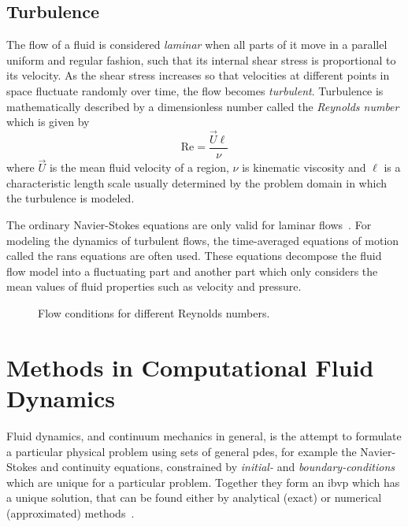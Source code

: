 \subsection{Turbulence}\label{sec:turbulence}
The flow of a fluid is considered \textit{laminar} when all parts of it move in a parallel uniform and regular fashion, such that its internal shear stress is proportional to its velocity.  As the shear stress increases so that velocities at different points in space fluctuate randomly over time, the flow becomes \textit{turbulent}. Turbulence is mathematically described by a dimensionless number called the \textit{Reynolds number} which is given by
\begin{equation}
\textrm{Re} = \frac{\vec{U}\ell}{\nu}
\end{equation}
where $\vec{U}$ is the mean fluid velocity of a region, $\nu$ is kinematic viscosity and $\ell$ is a characteristic length scale usually determined by the problem domain in which the turbulence is modeled. 

The ordinary Navier-Stokes equations are only valid for laminar flows~\cites[pg.639]{notes_on_cm}. For modeling the dynamics of turbulent flows, the time-averaged equations of motion called the \gls{rans} equations are often used. These equations decompose the fluid flow model into a fluctuating part and another part which only considers the mean values of fluid properties such as velocity and pressure.

\begin{figure}[H]
\centering
\begin{small}
\def\svgwidth{1.0\linewidth}

\end{small}
\caption{Flow conditions for different Reynolds numbers.}
\label{fig:reynold}
\end{figure}

\section{Methods in Computational Fluid Dynamics}\label{sec:cfd}
Fluid dynamics, and continuum mechanics in general, is the attempt to formulate a particular physical problem using sets of general \gls{pde}s, for example the Navier-Stokes and continuity equations, constrained by \textit{initial-} and \textit{boundary-conditions} which are unique for a particular problem. Together they form an \gls{ibvp} which has a unique solution, that can be found either by analytical (exact) or numerical (approximated) methods~\cites[pg.6]{notes_on_cm}.

